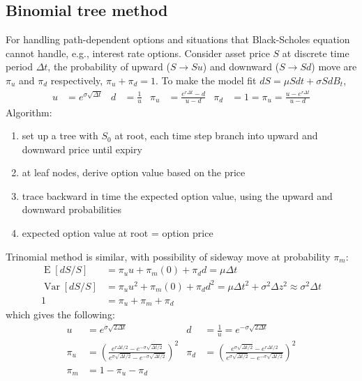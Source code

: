 \documentclass[9pt,twocolumn]{extarticle}
\DeclareMathOperator{\E}{E}
\DeclareMathOperator{\Var}{Var}
\begin{document}
\subsection*{Binomial tree method}

For handling path-dependent options and situations that Black-Scholes equation
cannot handle, e.g., interest rate options. Consider asset price $S$ at discrete
time period $\Delta t$, the probability of upward ($S\to Su$) and downward
($S\to Sd$) move are $\pi_u$ and $\pi_d$ respectively, $\pi_u+\pi_d = 1$.  To
make the model fit $dS=\mu Sdt + \sigma S dB_t$,
\begin{align*}
    u &= e^{\sigma\sqrt{\Delta t}} &
    d &= \frac{1}{u} &
\pi_u &= \frac{e^{r\Delta t} - d}{u-d} &
\pi_d &= 1=\pi_u = \frac{u - e^{r\Delta t}}{u-d}
\end{align*}
Algorithm:
\begin{enumerate}
\item set up a tree with $S_0$ at root, each time step branch into upward and downward price until expiry
\item at leaf nodes, derive option value based on the price
\item trace backward in time the expected option value, using the upward and downward probabilities
\item expected option value at root = option price
\end{enumerate}

Trinomial method is similar, with possibility of sideway move at probability $\pi_m$:
\begin{align*}
  \E[dS/S] &= \pi_u u + \pi_m (0) + \pi_d d = \mu \Delta t \\
\Var[dS/S] &= \pi_u u^2 + \pi_m (0) + \pi_d d^2 = \mu \Delta t^2 + \sigma^2 \Delta z^2 \approx \sigma^2 \Delta t \\
        1 &= \pi_u + \pi_m + \pi_d
\end{align*}
which gives the following:
\begin{align*}
    u &= e^{\sigma\sqrt{2 \Delta t}} &
    d &= \frac{1}{u} = e^{-\sigma\sqrt{2\Delta t}} \\
\pi_u &= \left(\frac{e^{r\Delta t/2} - e^{-\sigma\sqrt{\Delta t/2}}}
                    {e^{\sigma\sqrt{\Delta t/2}} - e^{-\sigma\sqrt{\Delta t/2}}}\right)^2 &
\pi_d &= \left(\frac{e^{\sigma\sqrt{\Delta t/2}} - e^{r\Delta t/2}}
                    {e^{\sigma\sqrt{\Delta t/2}} - e^{-\sigma\sqrt{\Delta t/2}}}\right)^2 \\
\pi_m &= 1-\pi_u-\pi_d
\end{align*}
\end{document}
